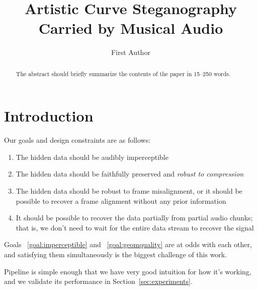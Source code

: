 \documentclass[runningheads]{llncs}
\begin{document}
%
\title{Artistic Curve Steganography Carried by Musical Audio}
%
%
\author{First Author}
%
%
%
\maketitle              %
%
\begin{abstract}
The abstract should briefly summarize the contents of the paper in
15--250 words.

\end{abstract}
%
%
%
\section{Introduction}



Our goals and design constraints are as follows:
\begin{enumerate}
    \item \label{goal:imperceptible} The hidden data should be audibly imperceptible
    \item \label{goal:geomquality} The hidden data should be faithfully preserved and {\em robust to compression}
    \item \label{goal:misalignment} The hidden data should be robust to frame misalignment, or it should be possible to recover a frame alignment without any prior information
    \item \label{goal:partial} It should be possible to recover the data partially from partial audio chunks; that is, we don't need to wait for the entire data stream to recover the signal
\end{enumerate}

Goals ~\ref{goal:imperceptible} and ~\ref{goal:geomquality} are at odds with each other, and satisfying them simultaneously is the biggest challenge of this work.

Pipeline is simple enough that we have very good intuition for how it's working, and we validate its performance in Section~\ref{sec:experiments}.
\end{document}
